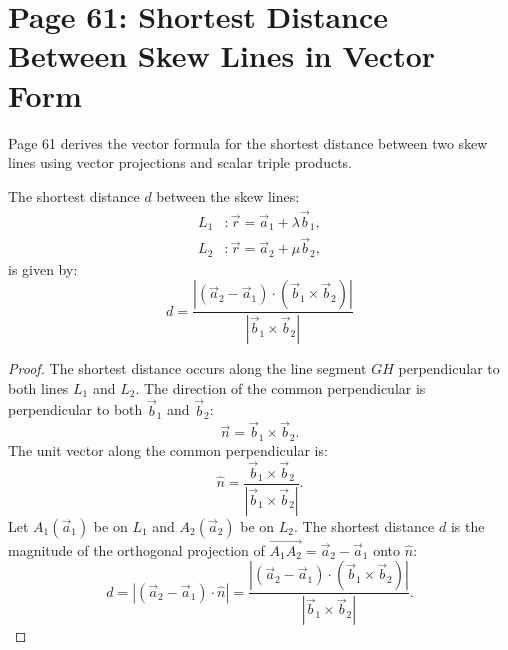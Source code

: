 \section{Page 61: Shortest Distance Between Skew Lines in Vector Form}
\label{sec:page61}

\begin{conceptbox}
Page 61 derives the vector formula for the shortest distance between two skew lines using vector projections and scalar triple products.
\end{conceptbox}

\begin{theorembox}
The shortest distance $d$ between the skew lines:
\begin{align}
    L_1 &: \vec{r} = \vec{a}_1 + \lambda \vec{b}_1, \\
    L_2 &: \vec{r} = \vec{a}_2 + \mu \vec{b}_2,
\end{align}
is given by:
\begin{equation}
    \boxed{d = \frac{|(\vec{a}_2 - \vec{a}_1) \cdot (\vec{b}_1 \times \vec{b}_2)|}{|\vec{b}_1 \times \vec{b}_2|}}
\end{equation}
\end{theorembox}

\begin{proof}
The shortest distance occurs along the line segment $GH$ perpendicular to both lines $L_1$ and $L_2$.
The direction of the common perpendicular is perpendicular to both $\vec{b}_1$ and $\vec{b}_2$:
\begin{equation}
    \vec{n} = \vec{b}_1 \times \vec{b}_2.
\end{equation}
The unit vector along the common perpendicular is:
\begin{equation}
    \hat{n} = \frac{\vec{b}_1 \times \vec{b}_2}{|\vec{b}_1 \times \vec{b}_2|}.
\end{equation}
Let $A_1(\vec{a}_1)$ be on $L_1$ and $A_2(\vec{a}_2)$ be on $L_2$.
The shortest distance $d$ is the magnitude of the orthogonal projection of $\vec{A_1 A_2} = \vec{a}_2 - \vec{a}_1$ onto $\hat{n}$:
\begin{equation}
    d = |(\vec{a}_2 - \vec{a}_1) \cdot \hat{n}| = \frac{|(\vec{a}_2 - \vec{a}_1) \cdot (\vec{b}_1 \times \vec{b}_2)|}{|\vec{b}_1 \times \vec{b}_2|}.
\end{equation}
\end{proof}

